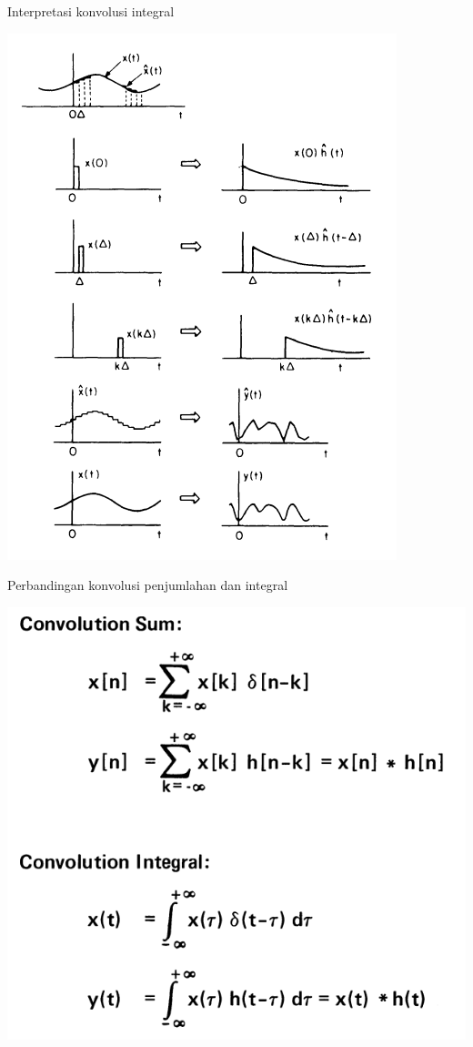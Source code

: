 \documentclass[aspectratio=169]{beamer}
\begin{document}
\begin{frame}{Interpretasi konvolusi integral}
	\begin{center}
		\includegraphics[height=0.8\textheight]{gambar/03.konvolusi/fig.4.07}
	\end{center}
\end{frame}

\begin{frame}{Perbandingan konvolusi penjumlahan dan integral}
	\begin{center}
		\includegraphics[height=0.8\textheight]{gambar/03.konvolusi/fig.4.08}
	\end{center}
\end{frame}
\end{document}
